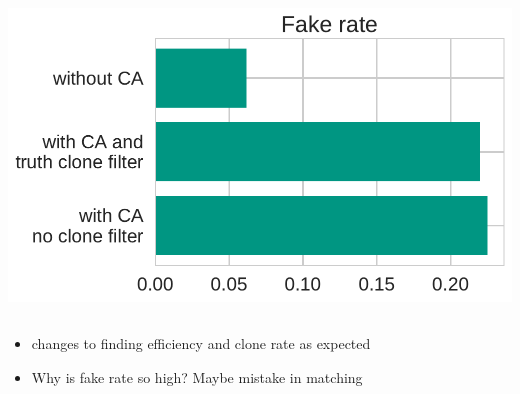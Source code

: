 \documentclass[18pt]{beamer}
\begin{document}
\begin{frame}
\begin{columns}
\begin{column}{0.33\textwidth}
      \includegraphics[width=\textwidth]{figures/ca_fake_rate.pdf}
    \end{column}
  \end{columns}
  \begin{itemize}
  \item changes to finding efficiency and clone rate as expected
  \item Why is fake rate so high? Maybe mistake in matching
  \end{itemize}
\end{frame}
\end{document}
